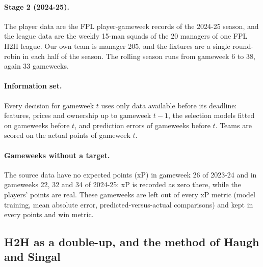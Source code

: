\documentclass[12pt,oneside,a4paper]{book}
\theoremstyle{definition}
\theoremstyle{remark}
\begin{document}
	\paragraph{Stage 2 (2024-25).} The player data are the FPL player-gameweek records of the
	2024-25 season, and the league data are the weekly 15-man squads of the 20 managers of one FPL
	H2H league. Our own team is manager 205, and the fixtures are a single round-robin in each half
	of the season. The rolling season runs from gameweek 6 to 38, again 33 gameweeks.

	\paragraph{Information set.} Every decision for gameweek $t$ uses only data available before
	its deadline: features, prices and ownership up to gameweek $t-1$, the selection models fitted
	on gameweeks before $t$, and prediction errors of gameweeks before $t$. Teams are scored on the
	actual points of gameweek $t$.

	\paragraph{Gameweeks without a target.} The source data have no expected points (xP) in
	gameweek 26 of 2023-24 and in gameweeks 22, 32 and 34 of 2024-25: xP is recorded as zero there,
	while the players' points are real. These gameweeks are left out of every xP metric (model
	training, mean absolute error, predicted-versus-actual comparisons) and kept in every points and
	win metric.

	\subsection{H2H as a double-up, and the method of Haugh and Singal}
	\label{sec:design-method}
\end{document}
